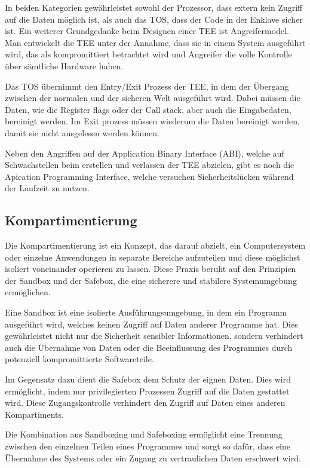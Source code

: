 In beiden Kategorien gewährleistet sowohl der Prozessor, dass extern kein Zugriff auf die Daten möglich ist, als auch das TOS, dass der Code in der Enklave sicher ist. Ein weiterer Grundgedanke beim Designen einer TEE ist Angreifermodel. Man entwickelt die TEE unter der Annahme, dass sie in einem System ausgeführt wird, das als kompromittiert betrachtet wird und Angreifer die volle Kontrolle über sämtliche Hardware haben.

Das TOS übernimmt den Entry/Exit Prozess der TEE, in dem der Übergang zwischen der normalen und der sicheren Welt ausgeführt wird. Dabei müssen die Daten, wie die Register flags oder der Call stack, aber auch die Eingabedaten, bereinigt werden. Im Exit prozess müssen wiederum die Daten bereinigt werden, damit sie nicht ausgelesen werden können.

Neben den Angriffen auf der Application Binary Interface (ABI), welche auf Schwachstellen beim erstellen und verlassen der TEE abzielen, gibt es noch die Apication Programming Interface, welche versuchen Sicherheitslücken während der Laufzeit zu nutzen.
\subsection{Kompartimentierung}

Die Kompartimentierung ist ein Konzept, das darauf abzielt, ein Computersystem oder einzelne Anwendungen in separate Bereiche aufzuteilen und diese möglichst isoliert voneinander operieren zu lassen. Diese Praxis beruht auf den Prinzipien der Sandbox und der Safebox, die eine sicherere und stabilere Systemumgebung ermöglichen. 

Eine Sandbox ist eine isolierte Ausführungsumgebung, in dem ein Programm ausgeführt wird, welches keinen Zugriff auf Daten anderer Programme hat. Dies gewährleistet nicht nur die Sicherheit sensibler Informationen, sondern verhindert auch die Übernahme von Daten oder die Beeinflussung des Programmes durch potenziell kompromittierte Softwareteile.


Im Gegensatz dazu dient die Safebox dem Schutz der eignen Daten. Dies wird ermöglicht, indem nur privilegierten Prozessen Zugriff auf die Daten gestattet wird. Diese Zugangskontrolle verhindert den Zugriff auf Daten eines anderen Kompartiments. 

Die Kombination aus Sandboxing und Safeboxing ermöglicht eine Trennung zwischen den einzelnen Teilen eines Programmes und sorgt so dafür, dass eine Übernahme des Systems oder ein Zugang zu vertraulichen Daten erschwert wird.


